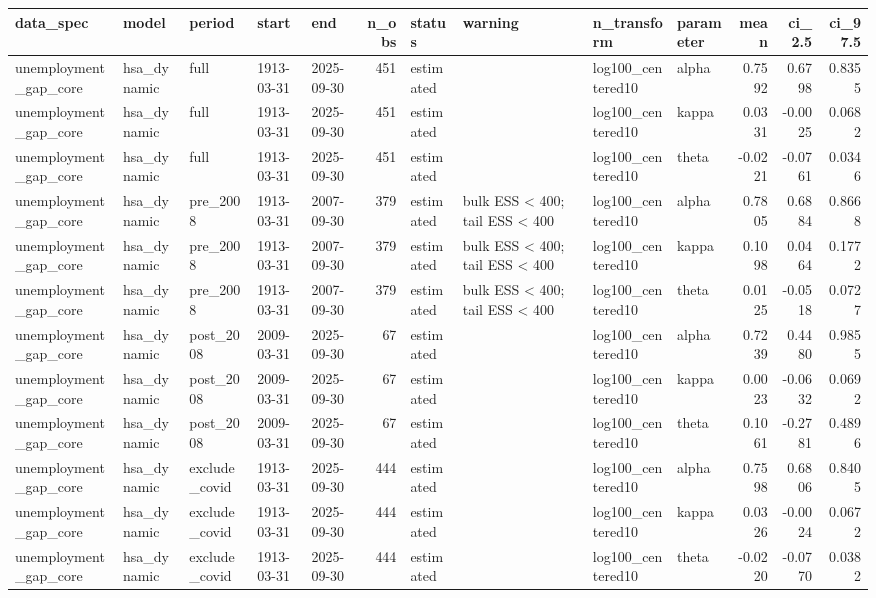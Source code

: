 \begin{tabular}{lllllrllllrrr}
\toprule
data\_spec & model & period & start & end & n\_obs & status & warning & n\_transform & parameter & mean & ci\_2.5 & ci\_97.5 \\
\midrule
unemployment\_gap\_core & hsa\_dynamic & full & 1913-03-31 & 2025-09-30 & 451 & estimated &  & log100\_centered10 & alpha & 0.7592 & 0.6798 & 0.8355 \\
unemployment\_gap\_core & hsa\_dynamic & full & 1913-03-31 & 2025-09-30 & 451 & estimated &  & log100\_centered10 & kappa & 0.0331 & -0.0025 & 0.0682 \\
unemployment\_gap\_core & hsa\_dynamic & full & 1913-03-31 & 2025-09-30 & 451 & estimated &  & log100\_centered10 & theta & -0.0221 & -0.0761 & 0.0346 \\
unemployment\_gap\_core & hsa\_dynamic & pre\_2008 & 1913-03-31 & 2007-09-30 & 379 & estimated & bulk ESS < 400; tail ESS < 400 & log100\_centered10 & alpha & 0.7805 & 0.6884 & 0.8668 \\
unemployment\_gap\_core & hsa\_dynamic & pre\_2008 & 1913-03-31 & 2007-09-30 & 379 & estimated & bulk ESS < 400; tail ESS < 400 & log100\_centered10 & kappa & 0.1098 & 0.0464 & 0.1772 \\
unemployment\_gap\_core & hsa\_dynamic & pre\_2008 & 1913-03-31 & 2007-09-30 & 379 & estimated & bulk ESS < 400; tail ESS < 400 & log100\_centered10 & theta & 0.0125 & -0.0518 & 0.0727 \\
unemployment\_gap\_core & hsa\_dynamic & post\_2008 & 2009-03-31 & 2025-09-30 & 67 & estimated &  & log100\_centered10 & alpha & 0.7239 & 0.4480 & 0.9855 \\
unemployment\_gap\_core & hsa\_dynamic & post\_2008 & 2009-03-31 & 2025-09-30 & 67 & estimated &  & log100\_centered10 & kappa & 0.0023 & -0.0632 & 0.0692 \\
unemployment\_gap\_core & hsa\_dynamic & post\_2008 & 2009-03-31 & 2025-09-30 & 67 & estimated &  & log100\_centered10 & theta & 0.1061 & -0.2781 & 0.4896 \\
unemployment\_gap\_core & hsa\_dynamic & exclude\_covid & 1913-03-31 & 2025-09-30 & 444 & estimated &  & log100\_centered10 & alpha & 0.7598 & 0.6806 & 0.8405 \\
unemployment\_gap\_core & hsa\_dynamic & exclude\_covid & 1913-03-31 & 2025-09-30 & 444 & estimated &  & log100\_centered10 & kappa & 0.0326 & -0.0024 & 0.0672 \\
unemployment\_gap\_core & hsa\_dynamic & exclude\_covid & 1913-03-31 & 2025-09-30 & 444 & estimated &  & log100\_centered10 & theta & -0.0220 & -0.0770 & 0.0382 \\

\end{tabular}
